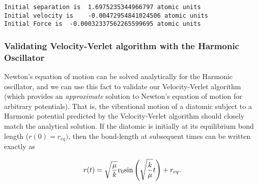 \documentclass[11pt]{article}
\begin{document}
    \begin{Verbatim}[commandchars=\\\{\}]
Initial separation is  1.6975235344966797 atomic units
Initial velocity is    -0.00472954841024506 atomic units
Initial Force is  -0.00032337562265599695 atomic units

    \end{Verbatim}

    \subsubsection{Validating Velocity-Verlet algorithm with the Harmonic
Oscillator}\label{validating-velocity-verlet-algorithm-with-the-harmonic-oscillator}

Newton's equation of motion can be solved analytically for the Harmonic
oscillator, and we can use this fact to validate our Velocity-Verlet
algorithm (which provides an \emph{approximate} solution to Newton's
equation of motion for arbitrary potentials). That is, the vibrational
motion of a diatomic subject to a Harmonic potential predicted by the
Velocity-Verlet algorithm should closely match the analytical solution.
If the diatomic is initially at its equilibrium bond length
(\(r(0) = r_{eq})\), then the bond-length at subsequent times can be
written exactly as

\begin{equation}
r(t) = \sqrt{\frac{\mu}{k}} v_0 {\rm sin}\left(\sqrt{\frac{k}{\mu}} t\right) + r_{eq}.
\end{equation}
\end{document}
